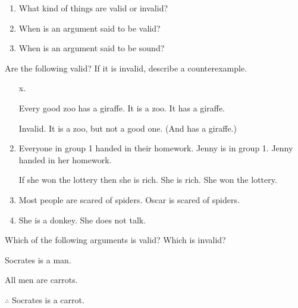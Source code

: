 \begin{practiceproblems}
\problempart
\begin{enumerate}
\item What kind of things are valid or invalid?
\item When is an argument said to be valid?
\item When is an argument said to be sound?
\end{enumerate}

\problempart
Are the following valid? If it is invalid, describe a counterexample.
\begin{enumerate}
\item[x.]
\begin{earg}
\prem Every good zoo has a giraffe.
\prem It is a zoo.
\conc It has a giraffe.
\end{earg}
\prem Invalid. It is a zoo, but not a good one. (And has a giraffe.)
\item
\begin{earg}
\prem Everyone in group 1 handed in their homework.
\prem Jenny is in group 1.
\conc Jenny handed in her homework.
\end{earg}
\begin{earg}
\prem If she won the lottery then she is rich.
\prem She is rich.
\conc She won the lottery.
\end{earg}
\item
\begin{earg}
\prem Most people are scared of spiders.
\conc Oscar is scared of spiders.
\end{earg}
\item
\begin{earg}
\prem She is a donkey.
\conc She does not talk.
\end{earg}
\end{enumerate}


\problempart
Which of the following arguments is valid? Which is invalid?

\begin{earg}
\item Socrates is a man.
\item All men are carrots.
\item[$\therefore$]  Socrates is a carrot. \hfill {}
\end{earg}


\end{practiceproblems}

